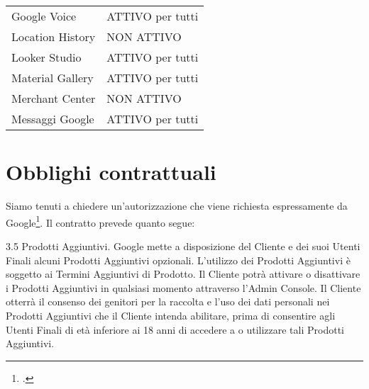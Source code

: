 \begin{center}
\begin{tabular}{ll}
Google Voice&
ATTIVO per tutti\\

Location History&
NON ATTIVO\\

Looker Studio&
ATTIVO per tutti\\

Material Gallery&
ATTIVO per tutti\\

Merchant Center&
NON ATTIVO\\

Messaggi Google&
ATTIVO per tutti\\
\bottomrule
\end{tabular}
\end{center}
\section{Obblighi contrattuali}
Siamo tenuti a chiedere un'autorizzazione che viene richiesta espressamente da Google\footcite{Google2020}. Il contratto prevede quanto segue:

3.5 Prodotti Aggiuntivi. Google mette a disposizione del Cliente e dei suoi Utenti Finali alcuni Prodotti Aggiuntivi opzionali. L’utilizzo dei Prodotti Aggiuntivi è soggetto ai Termini Aggiuntivi di Prodotto. Il Cliente potrà attivare o disattivare i Prodotti Aggiuntivi in qualsiasi momento attraverso l’Admin Console. Il Cliente otterrà il consenso dei genitori per la raccolta e l’uso dei dati personali nei Prodotti Aggiuntivi che il Cliente intenda abilitare, prima di consentire agli Utenti Finali di età inferiore ai 18 anni di accedere a o utilizzare tali Prodotti Aggiuntivi.
